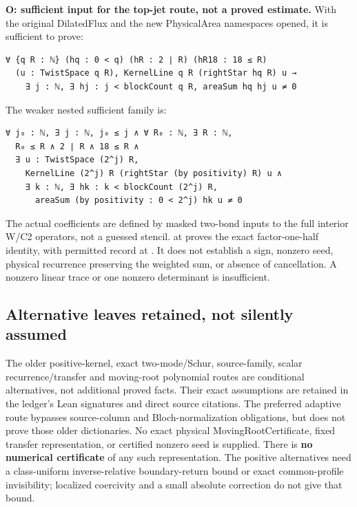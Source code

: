 \begin{theorem}
\label{open-area}
\textbf{O: sufficient input for the top-jet route, not a proved estimate.} With the original DilatedFlux and the new PhysicalArea namespaces opened, it is sufficient to prove:

\begin{verbatim}
∀ {q R : ℕ} (hq : 0 < q) (hR : 2 ∣ R) (hR18 : 18 ≤ R)
  (u : TwistSpace q R), KernelLine q R (rightStar hq R) u →
    ∃ j : ℕ, ∃ hj : j < blockCount q R, areaSum hq hj u ≠ 0
\end{verbatim}

The weaker nested sufficient family is:

\begin{verbatim}
∀ j₀ : ℕ, ∃ j : ℕ, j₀ ≤ j ∧ ∀ R₀ : ℕ, ∃ R : ℕ,
  R₀ ≤ R ∧ 2 ∣ R ∧ 18 ≤ R ∧
  ∃ u : TwistSpace (2^j) R,
    KernelLine (2^j) R (rightStar (by positivity) R) u ∧
    ∃ k : ℕ, ∃ hk : k < blockCount (2^j) R,
      areaSum (by positivity : 0 < 2^j) hk u ≠ 0
\end{verbatim}

The actual coefficients are defined by masked two-bond inputs to the full interior W/C2 operators, not a guessed stencil. \texttt{} at \texttt{} proves the exact factor-one-half identity, with permitted record at \texttt{}. It does not establish a sign, nonzero seed, physical recurrence preserving the weighted sum, or absence of cancellation. A nonzero linear trace or one nonzero determinant is insufficient.

\end{theorem}

\subsection{Alternative leaves retained, not silently assumed}

The older positive-kernel, exact two-mode/Schur, source-family, scalar recurrence/transfer and moving-root polynomial routes are conditional alternatives, not additional proved facts. Their exact assumptions are retained in the ledger's Lean signatures and direct source citations. The preferred adaptive route bypasses source-column and Bloch-normalization obligations, but does not prove those older dictionaries. No exact physical MovingRootCertificate, fixed transfer representation, or certified nonzero seed is supplied. There is \textbf{no numerical certificate} of any such representation. The positive alternatives need a class-uniform inverse-relative boundary-return bound or exact common-profile invisibility; localized coercivity and a small absolute correction do not give that bound.

